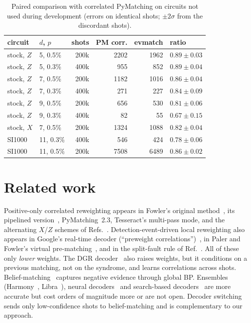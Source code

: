 \documentclass[aps,pra,twocolumn,superscriptaddress,nofootinbib]{revtex4-2}
\begin{document}
\begin{table}[t]
\caption{Paired comparison with correlated PyMatching on circuits not used during development
(errors on identical shots; $\pm2\sigma$ from the discordant shots).}
\label{tab:robust}
\begin{tabular}{llrrrl}
\toprule
circuit & $d$, $p$ & shots & PM corr. & evmatch & ratio \\
\midrule
stock, $Z$ & 5, 0.5\% & 200k & 2202 & 1962 & $0.89\pm0.03$ \\
stock, $Z$ & 5, 0.3\% & 400k & 955 & 852 & $0.89\pm0.04$ \\
stock, $Z$ & 7, 0.5\% & 200k & 1182 & 1016 & $0.86\pm0.04$ \\
stock, $Z$ & 7, 0.3\% & 400k & 271 & 227 & $0.84\pm0.09$ \\
stock, $Z$ & 9, 0.5\% & 200k & 656 & 530 & $0.81\pm0.06$ \\
stock, $Z$ & 9, 0.3\% & 400k & 82 & 55 & $0.67\pm0.15$ \\
stock, $X$ & 7, 0.5\% & 200k & 1324 & 1088 & $0.82\pm0.04$ \\
SI1000 & 11, 0.3\% & 400k & 546 & 424 & $0.78\pm0.06$ \\
SI1000 & 11, 0.5\% & 200k & 7508 & 6489 & $0.86\pm0.02$ \\
\bottomrule
\end{tabular}
\end{table}

\section{Related work}

Positive-only correlated reweighting appears in Fowler's original
method~\cite{fowler2013optimal}, its pipelined version~\cite{paler2023pipelined},
PyMatching~2.3, Tesseract's multi-pass mode, and the alternating $X$/$Z$
schemes of Refs.~\cite{delfosse2014decoding,yuan2022modified}. Detection-event-driven
local reweighting also appears in Google's real-time decoder
(``preweight correlations'')~\cite{google2025below}, in Paler and Fowler's
virtual pre-matching~\cite{paler2023pipelined}, and in the split-fault rule of
Ref.~\cite{grans2023improved}. All of these only \emph{lower} weights. The DGR
decoder~\cite{wang2023dgr} also raises weights, but it conditions on a previous
matching, not on the syndrome, and learns correlations across shots.
Belief-matching~\cite{higgott2023improved} captures negative evidence through
global BP. Ensembles (Harmony~\cite{shutty2024efficient},
Libra~\cite{jones2024improved}), neural decoders~\cite{bausch2024learning}
and search-based decoders~\cite{beni2025tesseract} are more accurate but cost
orders of magnitude more or are not open. Decoder switching~\cite{toshio2025decoder}
sends only low-confidence shots to belief-matching and is complementary to
our approach.
\end{document}
